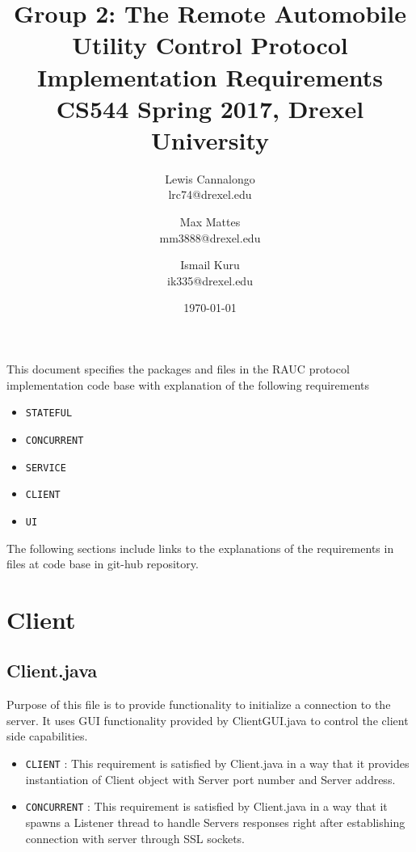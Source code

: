 \documentclass[12pt]{usenixsubmit}
\begin{document}

\title{Group 2: The Remote Automobile Utility Control Protocol Implementation Requirements \\ \Large{CS544 Spring 2017, Drexel University}}

\author{
    Lewis Cannalongo \\
    lrc74@drexel.edu
    \and
     Max Mattes \\
    mm3888@drexel.edu
    \and
    Ismail Kuru \\
    ik335@drexel.edu
}
\date{\today}

\maketitle
This document specifies the packages and files in the RAUC protocol implementation code base with explanation of the following requirements
\begin{itemize}
  \item {\tt STATEFUL}
  \item {\tt CONCURRENT}
  \item {\tt SERVICE}
  \item {\tt CLIENT}
  \item {\tt UI}
  \end{itemize}

The following sections include links to the explanations of the requirements in files at code base in git-hub repository.
\section{Client}
\subsection{Client.java}Purpose of this file is to provide functionality to initialize a connection to the server. It uses GUI functionality provided by ClientGUI.java to control the client side capabilities. 
\begin{itemize}
\item {\tt CLIENT} : This requirement is satisfied by Client.java in a way that it provides instantiation of Client object with Server port number and Server address.
  \item {\tt CONCURRENT} : This requirement is satisfied by Client.java in a way that it spawns a Listener thread to handle Servers responses right after establishing connection with server through SSL sockets.
\end{itemize}
           
\end{document}
